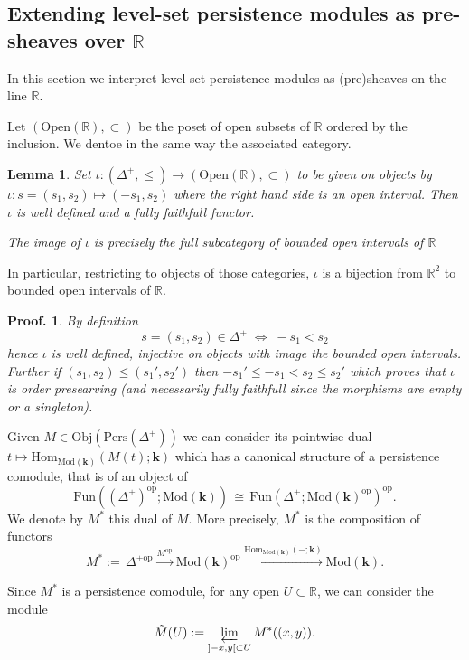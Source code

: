 \documentclass[a4paper, english, 11pt]{article}
\newcommand{\kk}[0]{\textbf{k}}
\newcommand{\Mod}[0]{\text{Mod}}
\newcommand{\Pe}{\text{Pers}}
\newcommand{\0}{\vec{0}}
\newcommand{\R}[0]{\mathbb{R}}
\newcommand{\Obj}[0]{\text{Obj}}
\newcommand{\Ouv}[0]{\mathrm{Open}}
\newcommand{\op}[0]{\text{op}}
\newcommand{\Hom}[0]{\text{Hom}}
\newtheorem*{pf}{Proof.} }
\newtheorem{lem}[prop]{Lemma}
\begin{document}
\subsection{Extending level-set persistence modules as pre-sheaves over $\R$}\label{SS:levelsettopresheaves}
In this section we interpret level-set persistence modules as (pre)sheaves on the line $\R$. 


 Let $(\Ouv(\R), \subset )$ be the poset of open subsets of $\R$ ordered by the inclusion. We dentoe in the same way the associated category.  
\begin{lem} \label{L:Defiota}Set $\iota: (\Delta^+, \leq)\to (\Ouv(\R), \subset)$ to be given on objects by 
  $\iota: s=(s_1, s_2) \mapsto (-s_1, s_2)$ where the right hand side is an open interval. 
  Then $\iota$ is well defined and a fully faithfull functor.
  
  The image of $\iota$ is precisely the full subcategory of bounded open intervals of $\R$ 
\end{lem}
In particular, restricting to objects of those categories,  $\iota$ is a bijection from $\R^2$ to bounded open intervals of $\R$. 
\begin{pf}
 By definition  $$ s=(s_1, s_2)\in \Delta^+ \;\Longleftrightarrow \;-s_1<s_2$$ hence $\iota$ is well defined, injective on objects with image the bounded open intervals.  Further if $(s_1, s_2)\leq (s_1', s_2')$ then 
 $-s_1'\leq -s_1<s_2\leq s_2'$ which proves that $\iota$ is order presearving (and necessarily fully faithfull since the morphisms are empty or a singleton). 
\end{pf}



Given $M \in \Obj(\Pe(\Delta^+))$ we can consider its pointwise dual $ t\mapsto \Hom_{\Mod(\kk)}(M(t);\kk)$ which has a canonical structure of a persistence comodule, that is of an object of  
$$\text{Fun}((\Delta^{+})^{\op}; \Mod(\kk))\,\cong\, \text{Fun}(\Delta^+; \Mod(\kk)^{\op})^{\op}. $$  We denote by $M^*$ this dual of $M$. More precisely, $M^*$ is the composition of functors
$$M^* :=\, \Delta^{+\op} \stackrel{M^{\op}}\longrightarrow \Mod(\kk)^{\op} \stackrel{\Hom_{\Mod(\kk)}(-;\kk)}\longrightarrow \Mod(\kk). $$

Since $M^*$ is a persistence comodule, for any  open $U \subset \R$, we can consider the module 
\begin{equation}\label{eq:defMtilde} 
\Tilde{M} (U):=  \varprojlim_{]-x,y[\subset U} M^*((x,y)).\end{equation}
                                     
\end{document}
